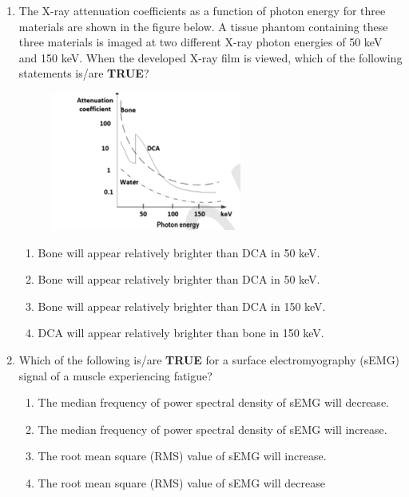\documentclass[a4paper,12pt]{exam}
\numberwithin{equation}{enumi}
\numberwithin{figure}{enumi}
\begin{document}
\begin{enumerate}
\item The X-ray attenuation coefficients as a function of photon energy for three materials  are shown in the figure below. A tissue phantom containing these three materials is  imaged at two different X-ray photon energies of 50 keV and 150 keV. When the 
developed X-ray film is viewed, which of the following statements is/are \textbf{TRUE}? 

\begin{figure}[H]
\centering
\includegraphics[width=0.5\columnwidth]{figs/Q48.png}
\label{fig:Q48.png}
\end{figure}

\hfill{}

\begin{enumerate}
\item Bone will appear relatively brighter than DCA in 50 keV. 
\item Bone will appear relatively brighter than DCA in 50 keV. 
\item Bone will appear relatively brighter than DCA in 150 keV.
\item DCA will appear relatively brighter than bone in 150 keV. 
\end{enumerate}  

\item Which of the following is/are \textbf{TRUE} for a surface electromyography (sEMG) signal of a muscle experiencing fatigue?

\hfill{}

\begin{enumerate}
\item The median frequency of power spectral density of sEMG will decrease. 
\item The median frequency of power spectral density of sEMG will increase. 
\item The root mean square (RMS) value of sEMG will increase. 
\item The root mean square (RMS) value of sEMG will decrease
\end{enumerate}  


\end{enumerate}
\end{document}
